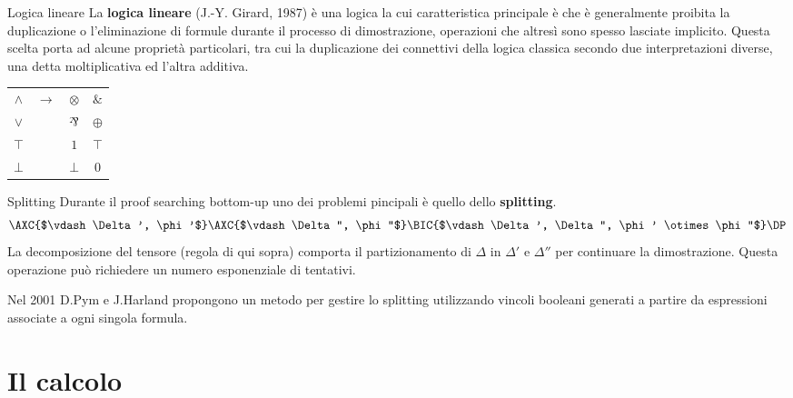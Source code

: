 \documentclass{beamer}
\newcommand{\llpar}{\rotatebox[origin=c]{180}{$\&$}}
\newcommand{\llten}{\otimes}
\newcommand{\llwith}{\&}
\newcommand{\llplus}{\oplus}
\newcommand{\llbot}{\bot}
\newcommand{\lltop}{\top}
\newcommand{\llone}{1}
\newcommand{\llzero}{0}
\begin{document}
\begin{frame}{Logica lineare}
	La \textbf{logica lineare} (J.-Y. Girard, 1987) è una logica la cui caratteristica principale è che è generalmente proibita la duplicazione o l'eliminazione di formule durante il processo di dimostrazione, operazioni che altresì sono spesso lasciate implicito.
	Questa scelta porta ad alcune proprietà particolari, tra cui la duplicazione dei connettivi della logica classica secondo due interpretazioni diverse, una detta moltiplicativa ed l'altra additiva.
	\begin{center}
		\begin{tabular}{cccc}
			$\wedge$ &\multirow{4}{.5cm}{$\rightarrow$} & $\llten$ & $\llwith$ \\
			$\vee$   &                                  & $\llpar$ & $\llplus$ \\
			$\top$   &                                  & $\llone$ & $\lltop$ \\
			$\bot$   &                                  & $\llbot$ & $\llzero$ \\
		\end{tabular}
	\end{center}
\end{frame}
\begin{frame}{Splitting}
	Durante il proof searching bottom-up uno dei problemi pincipali è quello dello \textbf{splitting}.
	$$
	\AXC{$\vdash \Delta', \phi'$}
	\AXC{$\vdash \Delta'', \phi''$}
	\LeftLabel{$\llten$}
	\BIC{$\vdash \Delta', \Delta'', \phi' \llten \phi''$}
	\DP
	$$
	La decomposizione del tensore (regola di qui sopra) comporta il partizionamento di $\Delta$ in $\Delta'$ e $\Delta''$ per continuare la dimostrazione.
	Questa operazione può richiedere un numero esponenziale di tentativi.

	Nel 2001 D.Pym e J.Harland propongono un metodo per gestire lo splitting utilizzando vincoli booleani generati a partire da espressioni associate a ogni singola formula.
\end{frame}

\section{Il calcolo}

% 

% 
\end{document}
